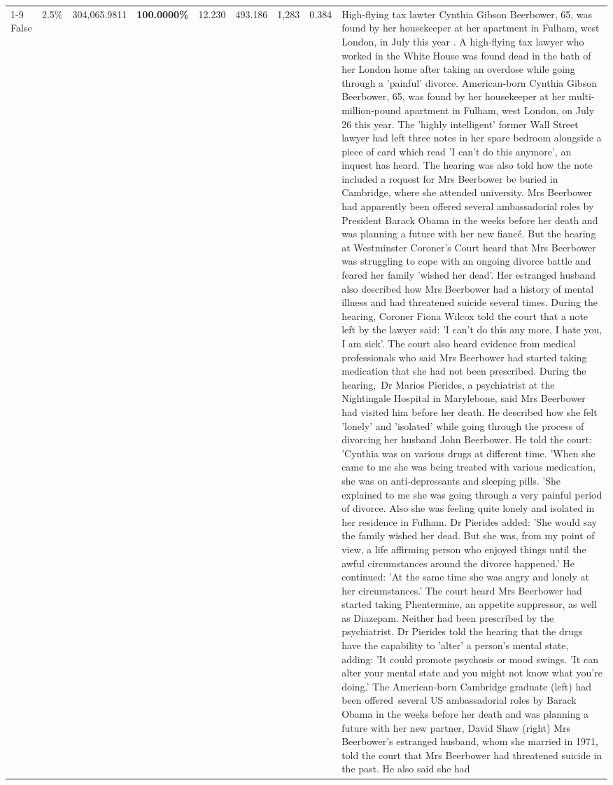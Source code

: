\begin{table}[H]
\begin{tabular}{lllrlllll}
\cline{1-9}
False & 2.5\% & \color{red} 304,065.9811 & \bfseries \color{red} 100.0000\% & 12.230 & 493.186 & 1,283 & 0.384 & High-flying tax lawter Cynthia Gibson Beerbower, 65, was found by her housekeeper at her apartment in Fulham, west London, in July this year . A high-flying tax lawyer who worked in the White House was found dead in the bath of her London home after taking an overdose while going through a 'painful' divorce. American-born Cynthia Gibson Beerbower, 65, was found by her housekeeper at her multi-million-pound apartment in Fulham, west London, on July 26 this year. The 'highly intelligent' former Wall Street lawyer had left three notes in her spare bedroom alongside a piece of card which read 'I can't do this anymore', an inquest has heard. The hearing was also told how the note included a request for Mrs Beerbower be buried in Cambridge, where she attended university. Mrs Beerbower had apparently been offered several ambassadorial roles by President Barack Obama in the weeks before her death and was planning a future with her new fiancé. But the hearing at Westminster Coroner's Court heard that Mrs Beerbower was struggling to cope with an ongoing divorce battle and feared her family 'wished her dead'. Her estranged husband also described how Mrs Beerbower had a history of mental illness and had threatened suicide several times. During the hearing, Coroner Fiona Wilcox told the court that a note left by the lawyer said: 'I can't do this any more, I hate you, I am sick'. The court also heard evidence from medical professionals who said Mrs Beerbower had started taking medication that she had not been prescribed. During the hearing, Dr Marios Pierides, a psychiatrist at the Nightingale Hospital in Marylebone, said Mrs Beerbower had visited him before her death. He described how she felt 'lonely' and 'isolated' while going through the process of divorcing her husband John Beerbower. He told the court: 'Cynthia was on various drugs at different time. 'When she came to me she was being treated with various medication, she was on anti-depressants and sleeping pills. 'She explained to me she was going through a very painful period of divorce. Also she was feeling quite lonely and isolated in her residence in Fulham. Dr Pierides added: 'She would say the family wished her dead. But she was, from my point of view, a life affirming person who enjoyed things until the awful circumstances around the divorce happened.' He continued: 'At the same time she was angry and lonely at her circumstances.' The court heard Mrs Beerbower had started taking Phentermine, an appetite suppressor, as well as Diazepam. Neither had been prescribed by the psychiatrist. Dr Pierides told the hearing that the drugs have the capability to 'alter' a person's mental state, adding: 'It could promote psychosis or mood swings. 'It can alter your mental state and you might not know what you're doing.' The American-born Cambridge graduate (left) had been offered several US ambassadorial roles by Barack Obama in the weeks before her death and was planning a future with her new partner, David Shaw (right) Mrs Beerbower's estranged husband, whom she married in 1971, told the court that Mrs Beerbower had threatened suicide in the past. He also said she had 
\end{tabular}
\end{table}
